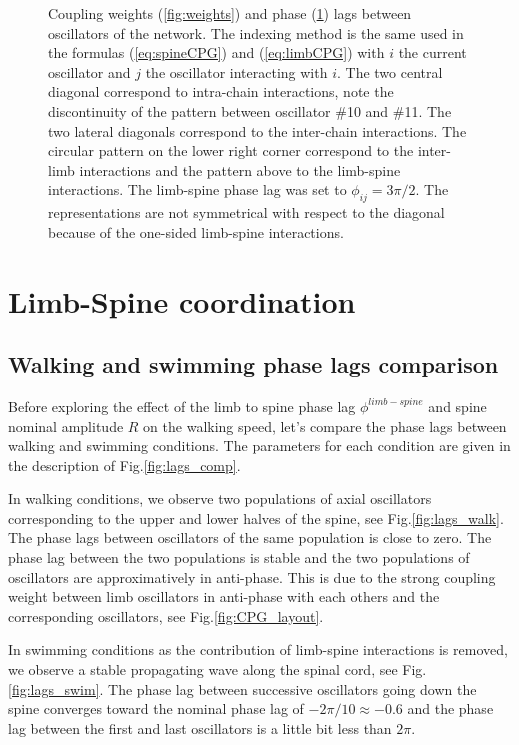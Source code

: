 \documentclass[a4paper]{scrartcl}
\begin{document}
{\begin{figure}
\begin{subfigure}[b]{\linewidth}
  \caption{\label{fig:phaselags}}
 \end{subfigure}
 \caption{\label{fig:weights_lags}Coupling weights (\ref{fig:weights}) and phase (\ref{fig:phaselags}) lags between oscillators of the network. The indexing method is the same used in the formulas (\ref{eq:spineCPG}) and (\ref{eq:limbCPG}) with $i$ the current oscillator and $j$ the oscillator interacting with $i$. The two central diagonal correspond to intra-chain interactions, note the discontinuity of the pattern between oscillator \#10 and \#11. The two lateral diagonals correspond to the inter-chain interactions. The circular pattern on the lower right corner correspond to the inter-limb interactions and the pattern above to the limb-spine interactions. The limb-spine phase lag was set to $\phi_{ij} = 3\pi/2$. The representations are not symmetrical with respect to the diagonal because of the one-sided limb-spine interactions.}
\end{figure}

\section{Limb-Spine coordination}

\subsection*{Walking and swimming phase lags comparison}
Before exploring the effect of the limb to spine phase lag $\phi^{limb-spine}$ and spine nominal amplitude $R$ on the walking speed, let's compare the phase lags between walking and swimming conditions. The parameters for each condition are given in the description of Fig.\ref{fig:lags_comp}. 

In walking conditions, we observe two populations of axial oscillators corresponding to the upper and lower halves of the spine, see Fig.\ref{fig:lags_walk}. The phase lags between oscillators of the same population is close to zero. The phase lag between the two populations is stable and the two populations of oscillators are approximatively in anti-phase. This is due to the strong coupling weight between limb oscillators in anti-phase with each others and the corresponding oscillators, see Fig.\ref{fig:CPG_layout}.

In swimming conditions as the contribution of limb-spine interactions is removed, we observe a stable propagating wave along the spinal cord, see Fig.\ref{fig:lags_swim}. The phase lag between successive oscillators going down the spine converges toward the nominal phase lag of $-2\pi/10\approx-0.6$ and the phase lag between the first and last oscillators is a little bit less than $2\pi$.

}
\end{document}
